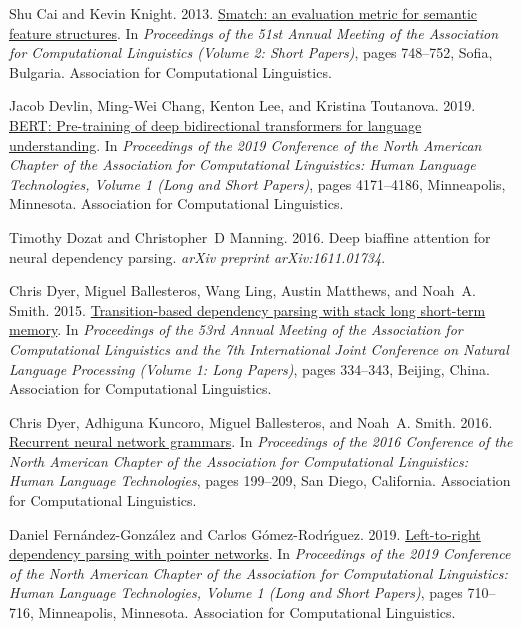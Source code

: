 \documentclass[11pt,a4paper]{article}
\begin{document}
\begin{thebibliography}{34}
Shu Cai and Kevin Knight. 2013.
\newblock \href {https://www.aclweb.org/anthology/P13-2131} {{S}match: an
  evaluation metric for semantic feature structures}.
\newblock In \emph{Proceedings of the 51st Annual Meeting of the Association
  for Computational Linguistics (Volume 2: Short Papers)}, pages 748--752,
  Sofia, Bulgaria. Association for Computational Linguistics.

Jacob Devlin, Ming-Wei Chang, Kenton Lee, and Kristina Toutanova. 2019.
\newblock \href {https://doi.org/10.18653/v1/N19-1423} {{BERT}: Pre-training of
  deep bidirectional transformers for language understanding}.
\newblock In \emph{Proceedings of the 2019 Conference of the North {A}merican
  Chapter of the Association for Computational Linguistics: Human Language
  Technologies, Volume 1 (Long and Short Papers)}, pages 4171--4186,
  Minneapolis, Minnesota. Association for Computational Linguistics.

Timothy Dozat and Christopher~D Manning. 2016.
\newblock Deep biaffine attention for neural dependency parsing.
\newblock \emph{arXiv preprint arXiv:1611.01734}.

Chris Dyer, Miguel Ballesteros, Wang Ling, Austin Matthews, and Noah~A. Smith.
  2015.
\newblock \href {https://doi.org/10.3115/v1/P15-1033} {Transition-based
  dependency parsing with stack long short-term memory}.
\newblock In \emph{Proceedings of the 53rd Annual Meeting of the Association
  for Computational Linguistics and the 7th International Joint Conference on
  Natural Language Processing (Volume 1: Long Papers)}, pages 334--343,
  Beijing, China. Association for Computational Linguistics.

Chris Dyer, Adhiguna Kuncoro, Miguel Ballesteros, and Noah~A. Smith. 2016.
\newblock \href {https://doi.org/10.18653/v1/N16-1024} {Recurrent neural
  network grammars}.
\newblock In \emph{Proceedings of the 2016 Conference of the North {A}merican
  Chapter of the Association for Computational Linguistics: Human Language
  Technologies}, pages 199--209, San Diego, California. Association for
  Computational Linguistics.

Daniel Fern{\'a}ndez-Gonz{\'a}lez and Carlos G{\'o}mez-Rodr{\'\i}guez. 2019.
\newblock \href {https://doi.org/10.18653/v1/N19-1076} {Left-to-right
  dependency parsing with pointer networks}.
\newblock In \emph{Proceedings of the 2019 Conference of the North {A}merican
  Chapter of the Association for Computational Linguistics: Human Language
  Technologies, Volume 1 (Long and Short Papers)}, pages 710--716, Minneapolis,
  Minnesota. Association for Computational Linguistics.


\end{thebibliography}
\end{document}
